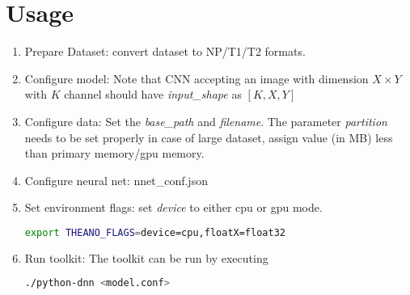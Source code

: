 \section{Usage}

\begin{enumerate}
	\item Prepare Dataset: convert dataset to NP/T1/T2 formats.
	\item Configure model: Note that CNN accepting an image with dimension $X \times Y$ with $K$ channel should have \textit{input\_shape} as $[K,X,Y]$
	\item Configure data: Set the \textit{base\_path} and \textit{filename}. The parameter \textit{partition} needs to be set properly in case of large dataset, assign value (in MB) less than primary memory/gpu memory. 
	\item Configure neural net: nnet\_conf.json
	\item Set environment flags: set \textit{device} to either cpu or gpu mode.
	\begin{lstlisting}[language=bash,basicstyle=\small] 
		export THEANO_FLAGS=device=cpu,floatX=float32
	\end{lstlisting}
	\item Run toolkit: The toolkit can be run by executing
	\begin{lstlisting}[language=bash,basicstyle=\small] 
		./python-dnn <model.conf>
	\end{lstlisting}
\end{enumerate}
